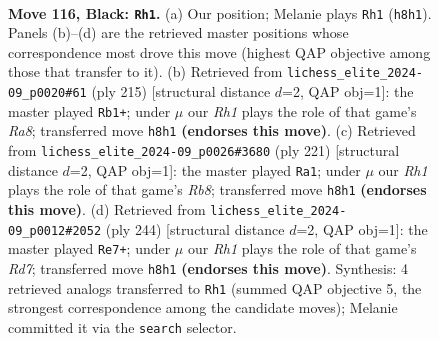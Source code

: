 \documentclass[11pt]{article}
\begin{document}
\clearpage

\begin{figure}[p]\centering
\begin{subfigure}{0.46\textwidth}\centering
\resizebox{\linewidth}{!}{%
\newchessgame
\chessboard[
  setfen={7r/1r6/8/8/4k3/6K1/8/8 b - - 7 116},
  showmover=false,
  pgfstyle=straightmove, color=movearrow, markmove={h8-h1}
]}
\caption{}
\end{subfigure}\hfill
\begin{subfigure}{0.46\textwidth}\centering
\resizebox{\linewidth}{!}{%
\newchessgame
\chessboard[
  setfen={8/6R1/1K6/3k4/8/8/8/r7 b - - 89 108},
  showmover=false,
  pgfstyle=straightmove, color=movearrow, markmove={a1-b1}
]}
\caption{}
\end{subfigure}
\\[4pt]
\begin{subfigure}{0.46\textwidth}\centering
\resizebox{\linewidth}{!}{%
\newchessgame
\chessboard[
  setfen={8/8/8/7R/8/2k5/4K3/1r6 b - - 74 111},
  showmover=false,
  pgfstyle=straightmove, color=movearrow, markmove={b1-a1}
]}
\caption{}
\end{subfigure}\hfill
\begin{subfigure}{0.46\textwidth}\centering
\resizebox{\linewidth}{!}{%
\newchessgame
\chessboard[
  setfen={8/3R4/8/r7/4k3/8/5K2/8 w - - 22 123},
  showmover=false,
  pgfstyle=straightmove, color=movearrow, markmove={d7-e7}
]}
\caption{}
\end{subfigure}
\caption{\textbf{Move 116, Black: \texttt{Rh1}.} (a) Our position; Melanie plays \texttt{Rh1} (\texttt{h8h1}). Panels (b)--(d) are the retrieved master positions whose correspondence most drove this move (highest QAP objective among those that transfer to it). (b) Retrieved from \texttt{lichess\_elite\_2024-09\_p0020\#61} (ply 215) [structural distance $d$=2, QAP obj=1]: the master played \texttt{Rb1+}; under $\mu$ our \emph{Rh1} plays the role of that game's \emph{Ra8}; transferred move \texttt{h8h1} \textbf{(endorses this move)}. (c) Retrieved from \texttt{lichess\_elite\_2024-09\_p0026\#3680} (ply 221) [structural distance $d$=2, QAP obj=1]: the master played \texttt{Ra1}; under $\mu$ our \emph{Rh1} plays the role of that game's \emph{Rb8}; transferred move \texttt{h8h1} \textbf{(endorses this move)}. (d) Retrieved from \texttt{lichess\_elite\_2024-09\_p0012\#2052} (ply 244) [structural distance $d$=2, QAP obj=1]: the master played \texttt{Re7+}; under $\mu$ our \emph{Rh1} plays the role of that game's \emph{Rd7}; transferred move \texttt{h8h1} \textbf{(endorses this move)}. Synthesis: 4 retrieved analogs transferred to \texttt{Rh1} (summed QAP objective 5, the strongest correspondence among the candidate moves); Melanie committed it via the \texttt{search} selector.}
\label{fig:thought-m231}
\end{figure}
\end{document}

